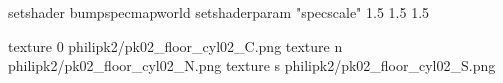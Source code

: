 setshader bumpspecmapworld
setshaderparam "specscale" 1.5 1.5 1.5

texture 0 philipk2/pk02_floor_cyl02_C.png
texture n philipk2/pk02_floor_cyl02_N.png
texture s philipk2/pk02_floor_cyl02_S.png

